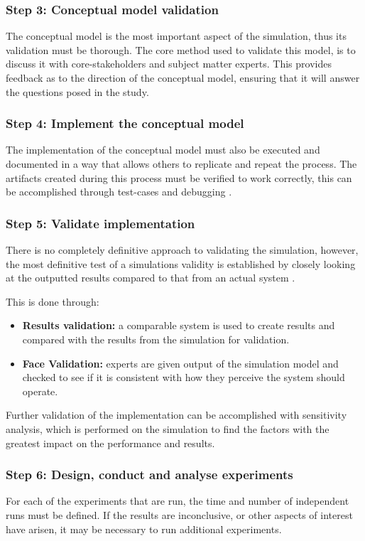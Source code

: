 \subsubsection{Step 3: Conceptual model validation}
The conceptual model is the most important aspect of the simulation, thus its validation must be thorough.
The core method used to validate this model, is to discuss it with core-stakeholders and subject matter experts.
This provides feedback as to the direction of the conceptual model, ensuring that it will answer the questions posed in the study.

\subsubsection{Step 4: Implement the conceptual model}
The implementation of the conceptual model must also be executed and documented in a way that allows others to replicate and repeat the process.
The artifacts created during this process must be verified to work correctly, this can be accomplished through test-cases and debugging \citep{Pressman1992}.

\subsubsection{Step 5: Validate implementation}
There is no completely definitive approach to validating the simulation,
however, the most definitive test of a simulations validity is established by closely looking at the outputted results compared to that from an actual system \citep{Law2005}.

This is done through:
\begin{itemize}
  \item \textbf{Results validation: } a comparable system is used to create results and compared with the results from the simulation for validation.
  \item \textbf{Face Validation: } experts are given output of the simulation model and checked to see if it is consistent with how they perceive the system should operate.
\end{itemize}

Further validation of the implementation can be accomplished with sensitivity analysis,
which is performed on the simulation to find the factors with the greatest impact on the performance and results.

\subsubsection{Step 6: Design, conduct and analyse experiments}
For each of the experiments that are run, the time and number of independent runs must be defined.
If the results are inconclusive, or other aspects of interest have arisen, it may be necessary to run additional experiments.

